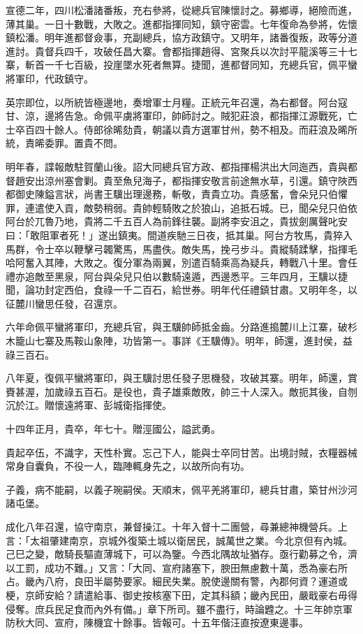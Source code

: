 \begin{pinyinscope}
宣德二年，四川松潘諸番叛，充右參將，從總兵官陳懷討之。募鄉導，絕險而進，薄其巢。一日十數戰，大敗之。進都指揮同知，鎮守密雲。七年復命為參將，佐懷鎮松潘。明年進都督僉事，充副總兵，協方政鎮守。又明年，諸番復叛，政等分道進討。貴督兵四千，攻破任昌大寨。會都指揮趙得、宮聚兵以次討平龍溪等三十七寨，斬首一千七百級，投崖墜水死者無算。捷聞，進都督同知，充總兵官，佩平蠻將軍印，代政鎮守。

英宗即位，以所統皆極邊地，奏增軍士月糧。正統元年召還，為右都督。阿台寇甘、涼，邊將告急。命佩平虜將軍印，帥師討之。賊犯莊浪，都指揮江源戰死，亡士卒百四十餘人。侍郎徐晞劾貴，朝議以貴方選軍甘州，勢不相及。而莊浪及晞所統，責晞委罪。置貴不問。

明年春，諜報敵駐賀蘭山後。詔大同總兵官方政、都指揮楊洪出大同迤西，貴與都督趙安出涼州塞會剿。貴至魚兒海子，都指揮安敬言前途無水草，引還。鎮守陜西都御史陳鎰言狀，尚書王驥出理邊務，斬敬，責貴立功。貴感奮，會朵兒只伯懼罪，連遣使入貢，敵勢稍弱。貴帥輕騎敗之於狼山，追抵石城。已，聞朵兒只伯依阿台於兀魯乃地，貴將二千五百人為前鋒往襲。副將李安沮之，貴拔劍厲聲叱安曰：「敢阻軍者死！」遂出鎮夷。間道疾馳三日夜，抵其巢。阿台方牧馬，貴猝入馬群，令士卒以鞭擊弓韣驚馬，馬盡佚。敵失馬，挽弓步斗。貴縱騎蹂擊，指揮毛哈阿奮入其陣，大敗之。復分軍為兩翼，別遣百騎乘高為疑兵，轉戰八十里。會任禮亦追敵至黑泉，阿台與朵兒只伯以數騎遠遁，西邊悉平。三年四月，王驥以捷聞，論功封定西伯，食祿一千二百石，給世券。明年代任禮鎮甘肅。又明年冬，以征麓川蠻思任發，召還京。

六年命佩平蠻將軍印，充總兵官，與王驥帥師抵金齒。分路進搗麓川上江寨，破杉木籠山七寨及馬鞍山象陣，功皆第一。事詳《王驥傳》。明年，師還，進封侯，益祿三百石。

八年夏，復佩平蠻將軍印，與王驥討思任發子思機發，攻破其寨。明年，師還，賞賚甚渥，加歲祿五百石。是役也，貴子雄乘敵敗，帥三十人深入。敵扼其後，自刎沉於江。贈懷遠將軍、彭城衛指揮使。

十四年正月，貴卒，年七十。贈涇國公，謚武勇。

貴起卒伍，不識字，天性朴實。忘己下人，能與士卒同甘苦。出境討賊，衣糧器械常身自囊負，不役一人，臨陣輒身先之，以故所向有功。

子義，病不能嗣，以義子琬嗣侯。天順末，佩平羌將軍印，總兵甘肅，築甘州沙河諸屯堡。

成化八年召還，協守南京，兼督操江。十年入督十二團營，尋兼總神機營兵。上言：「太祖肇建南京，京城外復築土城以衛居民，誠萬世之業。今北京但有內城。己巳之變，敵騎長驅直薄城下，可以為鑒。今西北隅故址猶存。亟行勸募之令，濟以工罰，成功不難。」又言：「大同、宣府諸塞下，腴田無慮數十萬，悉為豪右所占。畿內八府，良田半屬勢要家。細民失業。脫使邊關有警，內郡何資？運道或梗，京師安給？請遣給事、御史按核塞下田，定其科額；畿內民田，嚴戢豪右毋得侵奪。庶兵民足食而內外有備。」章下所司。雖不盡行，時論韙之。十三年帥京軍防秋大同、宣府，陳機宜十餘事。皆報可。十五年偕汪直按遼東邊事。


\end{pinyinscope}
